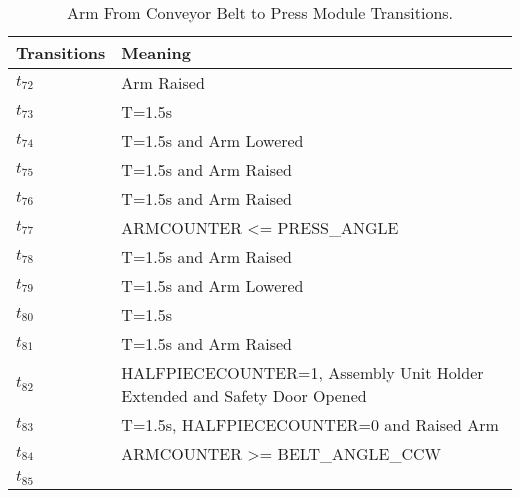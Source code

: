 \begin{table}[H]
\caption{Arm From Conveyor Belt to Press Module Transitions.}
\centering
\begin{tabular}{M{5cm}M{10cm}}
Transitions & Meaning\\
\hline
\hyperlink{partialNet:t72}{\hypertarget{partialTable:t72}{$t_{72}$}} & Arm Raised\\
\hyperlink{partialNet:tt73}{\hypertarget{partialTable:tt73}{$t_{73}$}} & T=1.5s\\
\hyperlink{partialNet:tt74}{\hypertarget{partialTable:tt74}{$t_{74}$}} & T=1.5s and Arm Lowered\\
\hyperlink{partialNet:tt75}{\hypertarget{partialTable:tt75}{$t_{75}$}} & T=1.5s and Arm Raised\\
\hyperlink{partialNet:tt76}{\hypertarget{partialTable:tt76}{$t_{76}$}} & T=1.5s and Arm Raised\\
\hyperlink{partialNet:t77}{\hypertarget{partialTable:t77}{$t_{77}$}} & ARMCOUNTER <= PRESS\_ANGLE\\
\hyperlink{partialNet:tt78}{\hypertarget{partialTable:tt78}{$t_{78}$}} & T=1.5s and Arm Raised\\
\hyperlink{partialNet:tt79}{\hypertarget{partialTable:tt79}{$t_{79}$}} & T=1.5s and Arm Lowered\\
\hyperlink{partialNet:tt80}{\hypertarget{partialTable:tt80}{$t_{80}$}} & T=1.5s\\
\hyperlink{partialNet:tt81}{\hypertarget{partialTable:tt81}{$t_{81}$}} & T=1.5s and Arm Raised\\
\hyperlink{partialNet:t82}{\hypertarget{partialTable:t82}{$t_{82}$}} & HALFPIECECOUNTER=1, Assembly Unit Holder Extended and Safety Door Opened\\
\hyperlink{partialNet:tt83}{\hypertarget{partialTable:tt83}{$t_{83}$}} & T=1.5s, HALFPIECECOUNTER=0 and Raised Arm\\
\hyperlink{partialNet:t84}{\hypertarget{partialTable:t84}{$t_{84}$}} & ARMCOUNTER >= BELT\_ANGLE\_CCW\\
\hyperlink{partialNet:t85}{\hypertarget{partialTable:t85}{$t_{85}$}} & \\
\end{tabular}
\end{table}
